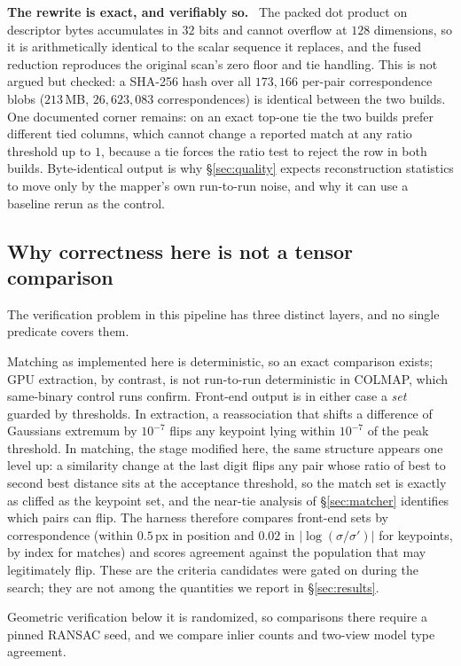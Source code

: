 \documentclass[conference]{IEEEtran}
\newcommand{\para}[1]{\smallskip\noindent\textbf{#1}\ }
\begin{document}
\para{The rewrite is exact, and verifiably so.} The packed dot product on
descriptor bytes accumulates in $32$ bits and cannot overflow at $128$
dimensions, so it is arithmetically identical to the scalar sequence it
replaces, and the fused reduction reproduces the original scan's zero floor and
tie handling. This is not argued but checked: a SHA-256 hash over all
$173{,}166$ per-pair correspondence blobs ($213$\,MB, $26{,}623{,}083$
correspondences) is identical between the two builds. One documented corner
remains: on an exact top-one tie the two builds prefer different tied columns,
which cannot change a reported match at any ratio threshold up to $1$, because
a tie forces the ratio test to reject the row in both builds. Byte-identical
output is why \S\ref{sec:quality} expects reconstruction statistics to move
only by the mapper's own run-to-run noise, and why it can use a baseline rerun
as the control.

\subsection{Why correctness here is not a tensor comparison}
\label{sec:correctness}

The verification problem in this pipeline has three distinct layers, and no
single predicate covers them.

Matching as implemented here is deterministic, so an exact comparison exists;
GPU extraction, by contrast, is not run-to-run deterministic in COLMAP, which
same-binary control runs confirm. Front-end output is in either case a
\emph{set} guarded by thresholds. In extraction, a
reassociation that shifts a difference of Gaussians extremum by $10^{-7}$ flips
any keypoint lying within $10^{-7}$ of the peak threshold. In matching, the
stage modified here, the same structure appears one level up: a similarity
change at the last digit flips any pair whose ratio of best to second best
distance sits at the acceptance threshold, so the match set is exactly as
cliffed as the keypoint set, and the near-tie analysis of \S\ref{sec:matcher}
identifies which pairs can flip. The harness therefore compares front-end sets
by correspondence (within $0.5$\,px in position and $0.02$ in
$\lvert\log(\sigma/\sigma')\rvert$ for keypoints, by index for matches) and
scores agreement against the population that may legitimately flip. These are
the criteria candidates were gated on during the search; they are not among the
quantities we report in \S\ref{sec:results}.

Geometric verification below it is randomized, so comparisons there require a
pinned RANSAC seed, and we compare inlier counts and two-view model type
agreement.
\end{document}
